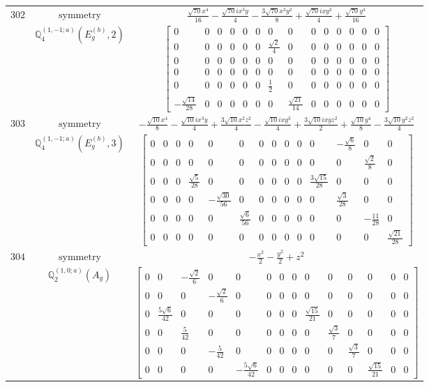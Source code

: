 \documentclass[fleqn,8pt,landscape]{jsarticle}
\begin{document}
\begin{longtable}{ccc}
$ 302 $ & $ \text{symmetry} $ & $ \frac{\sqrt{70} x^{4}}{16} - \frac{\sqrt{70} i x^{3} y}{4} - \frac{3 \sqrt{70} x^{2} y^{2}}{8} + \frac{\sqrt{70} i x y^{3}}{4} + \frac{\sqrt{70} y^{4}}{16} $ \\
$  $ & $ \mathbb{Q}_{4}^{(1,-1;a)}(E_{g}^{(b)},2) $ & $ \begin{bmatrix} 0 & 0 & 0 & 0 & 0 & 0 & 0 & 0 & 0 & 0 & 0 & 0 & 0 & 0 \\ 0 & 0 & 0 & 0 & 0 & 0 & \frac{\sqrt{2}}{4} & 0 & 0 & 0 & 0 & 0 & 0 & 0 \\ 0 & 0 & 0 & 0 & 0 & 0 & 0 & 0 & 0 & 0 & 0 & 0 & 0 & 0 \\ 0 & 0 & 0 & 0 & 0 & 0 & 0 & 0 & 0 & 0 & 0 & 0 & 0 & 0 \\ 0 & 0 & 0 & 0 & 0 & 0 & \frac{1}{2} & 0 & 0 & 0 & 0 & 0 & 0 & 0 \\ - \frac{\sqrt{14}}{28} & 0 & 0 & 0 & 0 & 0 & 0 & \frac{\sqrt{21}}{14} & 0 & 0 & 0 & 0 & 0 & 0 \end{bmatrix} $ \\ \hline
$ 303 $ & $ \text{symmetry} $ & $ - \frac{\sqrt{10} x^{4}}{8} - \frac{\sqrt{10} i x^{3} y}{4} + \frac{3 \sqrt{10} x^{2} z^{2}}{4} - \frac{\sqrt{10} i x y^{3}}{4} + \frac{3 \sqrt{10} i x y z^{2}}{2} + \frac{\sqrt{10} y^{4}}{8} - \frac{3 \sqrt{10} y^{2} z^{2}}{4} $ \\
$  $ & $ \mathbb{Q}_{4}^{(1,-1;a)}(E_{g}^{(b)},3) $ & $ \begin{bmatrix} 0 & 0 & 0 & 0 & 0 & 0 & 0 & 0 & 0 & 0 & 0 & - \frac{\sqrt{6}}{8} & 0 & 0 \\ 0 & 0 & 0 & 0 & 0 & 0 & 0 & 0 & 0 & 0 & 0 & 0 & \frac{\sqrt{2}}{8} & 0 \\ 0 & 0 & 0 & \frac{\sqrt{5}}{28} & 0 & 0 & 0 & 0 & 0 & 0 & \frac{3 \sqrt{15}}{28} & 0 & 0 & 0 \\ 0 & 0 & 0 & 0 & - \frac{\sqrt{30}}{56} & 0 & 0 & 0 & 0 & 0 & 0 & \frac{\sqrt{3}}{28} & 0 & 0 \\ 0 & 0 & 0 & 0 & 0 & \frac{\sqrt{6}}{56} & 0 & 0 & 0 & 0 & 0 & 0 & - \frac{11}{28} & 0 \\ 0 & 0 & 0 & 0 & 0 & 0 & 0 & 0 & 0 & 0 & 0 & 0 & 0 & \frac{\sqrt{21}}{28} \end{bmatrix} $ \\ \hline
$ 304 $ & $ \text{symmetry} $ & $ - \frac{x^{2}}{2} - \frac{y^{2}}{2} + z^{2} $ \\
$  $ & $ \mathbb{Q}_{2}^{(1,0;a)}(A_{g}) $ & $ \begin{bmatrix} 0 & 0 & - \frac{\sqrt{2}}{6} & 0 & 0 & 0 & 0 & 0 & 0 & 0 & 0 & 0 & 0 & 0 \\ 0 & 0 & 0 & - \frac{\sqrt{2}}{6} & 0 & 0 & 0 & 0 & 0 & 0 & 0 & 0 & 0 & 0 \\ 0 & \frac{5 \sqrt{6}}{42} & 0 & 0 & 0 & 0 & 0 & 0 & \frac{\sqrt{15}}{21} & 0 & 0 & 0 & 0 & 0 \\ 0 & 0 & \frac{5}{42} & 0 & 0 & 0 & 0 & 0 & 0 & \frac{\sqrt{3}}{7} & 0 & 0 & 0 & 0 \\ 0 & 0 & 0 & - \frac{5}{42} & 0 & 0 & 0 & 0 & 0 & 0 & \frac{\sqrt{3}}{7} & 0 & 0 & 0 \\ 0 & 0 & 0 & 0 & - \frac{5 \sqrt{6}}{42} & 0 & 0 & 0 & 0 & 0 & 0 & \frac{\sqrt{15}}{21} & 0 & 0 \end{bmatrix} $ \\ \hline

\end{longtable}
\end{document}
